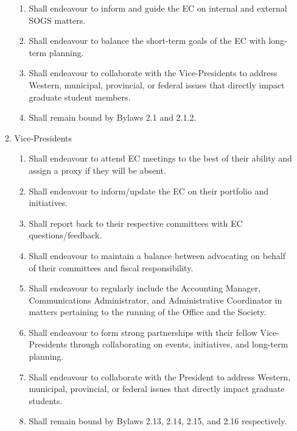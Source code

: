 \begin{enumerate}[label*=\arabic*., align=left]
\begin{enumerate}[label*=\arabic*., align=left]
\begin{enumerate}[label*=\arabic*., align=left]
\item Shall endeavour to inform and guide the EC on internal and external SOGS matters.
\item Shall endeavour to balance the short-term goals of the EC with long-term planning.
\item Shall endeavour to collaborate with the Vice-Presidents to address Western, municipal, provincial, or federal issues that directly impact graduate student members.
\item Shall remain bound by Bylaws 2.1 and 2.1.2.
\end{enumerate}
\item Vice-Presidents
\begin{enumerate}[label*=\arabic*., align=left]
\item Shall endeavour to attend EC meetings to the best of their ability and assign a proxy if they will be absent.
\item Shall endeavour to inform/update the EC on their portfolio and initiatives. 
\item Shall report back to their respective committees with EC questions/feedback.
\item Shall endeavour to maintain a balance between advocating on behalf of their committees and fiscal responsibility.
\item Shall endeavour to regularly include the Accounting Manager, Communications Administrator, and Administrative Coordinator in matters pertaining to the running of the Office and the Society.
\item Shall endeavour to form strong partnerships with their fellow Vice-Presidents through collaborating on events, initiatives, and long-term planning.
\item Shall endeavour to collaborate with the President to address Western, municipal, provincial, or federal issues that directly impact graduate students.
\item Shall remain bound by Bylaws 2.13, 2.14, 2.15, and 2.16 respectively.
\end{enumerate}
\end{enumerate}
\end{enumerate}

